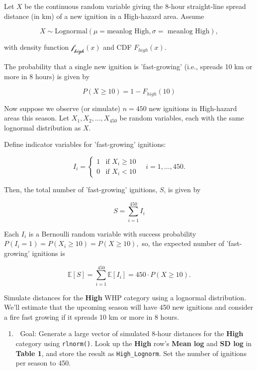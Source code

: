 \documentclass[
  12pt,
]{scrreprt}
\providecommand{\tightlist}{%
  \setlength{\itemsep}{0pt}\setlength{\parskip}{0pt}}
\begin{document}
\begin{customtextbox}

Let $X$ be the continuous random variable giving the 8-hour straight-line spread distance (in km) of a new ignition in a High-hazard area. Assume

$$ X \sim \text{Lognormal}(\mu = \text{meanlog High}, \sigma = \text{ meanlog High}), $$

with density function $\mathcal{f_{high}}(x)$ and CDF $F_{high}(x)$. 

The probability that a single new ignition is 'fast-growing' (i.e., spreads 10 km or more in 8 hours) is given by

$$ P(X \geq 10) = 1 - F_{high}(10)$$

Now suppose we observe (or simulate) $n = 450$ new ignitions in High-hazard areas this season. Let $X_1, X_2, \ldots, X_{450}$ be random variables, each with the same lognormal distribution as $X$. 

Define indicator variables for 'fast-growing' ignitions:

$$ I_i = \begin{cases} 1 & \text{if } X_i \geq 10 \\ 0 & \text{if } X_i < 10 \end{cases} \quad i = 1,\dots,450.$$

Then, the total number of 'fast-growing' ignitions, $S$, is given by

$$ S = \sum_{i=1}^{450} I_i $$

Each $I_i$ is a Bernoulli random variable with success probability $P(I_i = 1) = P(X_i \geq 10) = P(X \geq 10),$ so, the expected number of 'fast-growing' ignitions is

$$ \mathbb{E}[S] = \sum_{i=1}^{450} \mathbb{E}[I_i] = 450 \cdot P(X \geq 10). $$

\end{customtextbox}

Simulate distances for the \textbf{High} WHP category using a lognormal distribution. We'll estimate that the upcoming season will have 450 new ignitions and consider a fire fast growing if it spreads 10 km or more in 8 hours.

\begin{enumerate}
\def\labelenumi{\arabic{enumi}.}
\tightlist
\item
  🎯 Goal: Generate a large vector of simulated 8-hour distances for the \textbf{High} category using \texttt{rlnorm()}. Look up the \textbf{High} row's \textbf{Mean log} and \textbf{SD log} in \textbf{Table 1}, and store the result as \texttt{High\_Lognorm}. Set the number of ignitions per season to 450.
\end{enumerate}
\end{document}
